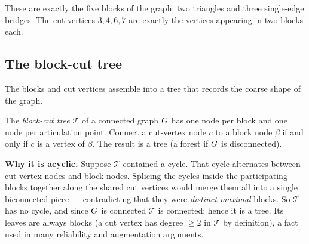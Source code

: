 These are exactly the five blocks of the graph: two triangles and three single-edge bridges.
The cut vertices $3,4,6,7$ are exactly the vertices appearing in two blocks each.

\subsection{The block-cut tree}
\label{ch10:bctree}

The blocks and cut vertices assemble into a tree that records the coarse shape of the
graph.

\begin{definition}
\label{ch10:def-bctree}
The \emph{block-cut tree} $\mathcal{T}$ of a connected graph $G$ has one node per
block and one node per articulation point. Connect a cut-vertex node $c$ to a block
node $\beta$ if and only if $c$ is a vertex of $\beta$. The result is a tree (a forest if $G$
is disconnected).
\end{definition}

\begin{whybox}
\textbf{Why it is acyclic.} Suppose $\mathcal{T}$ contained a cycle. That cycle
alternates between cut-vertex nodes and block nodes. Splicing the cycles inside the
participating blocks together along the shared cut vertices would merge them all into a
single biconnected piece --- contradicting that they were \emph{distinct maximal}
blocks. So $\mathcal{T}$ has no cycle, and since $G$ is connected $\mathcal{T}$ is
connected; hence it is a tree. Its leaves are always blocks (a cut vertex has degree
$\ge2$ in $\mathcal{T}$ by definition), a fact used in many reliability and augmentation
arguments.
\end{whybox}

\begin{center}
\end{center}

